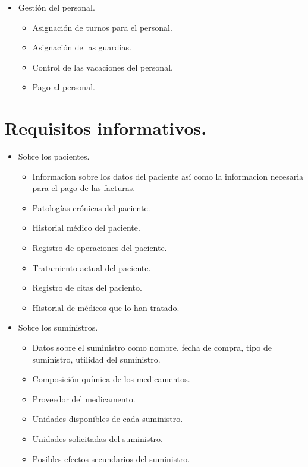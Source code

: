 \documentclass[11pt]{article}
\begin{document}
\begin{itemize}
\item Gestión del personal.
\begin{itemize}
\item Asignación de turnos para el personal.
\item Asignación de las guardias.
\item Control de las vacaciones del personal.
\item Pago al personal.
\end{itemize}
\end{itemize}

\section{Requisitos informativos.}
\label{sec:orgc9a3a25}

\begin{itemize}
\item Sobre los pacientes.
\begin{itemize}
\item Informacion sobre los datos del paciente así como la informacion necesaria para el pago de las facturas.
\item Patologías crónicas del paciente.
\item Historial médico del paciente.
\item Registro de operaciones del paciente.
\item Tratamiento actual del paciente.
\item Registro de citas del paciento.
\item Historial de médicos que lo han tratado.
\end{itemize}

\item Sobre los suministros.
\begin{itemize}
\item Datos sobre el suministro como nombre, fecha de compra, tipo de suministro, utilidad del suministro.
\item Composición química de los medicamentos.
\item Proveedor del medicamento.
\item Unidades disponibles de cada suministro.
\item Unidades solicitadas del suministro.
\item Posibles efectos secundarios del suministro.
\end{itemize}


\end{itemize}
\end{document}
